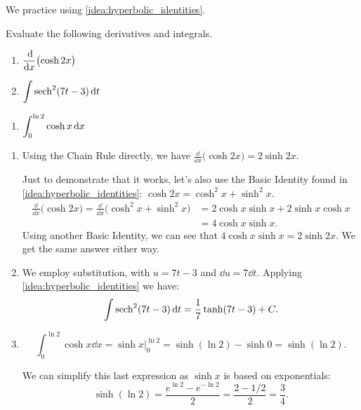 We practice using \autoref{idea:hyperbolic_identities}.

\begin{example}\label{ex_hf2}%
Evaluate the following derivatives and integrals.\\
\begin{minipage}[t]{.5\linewidth}
\begin{enumerate}
\item		$\displaystyle\frac{\operatorname{d}\!}{\operatorname{d}\! x}\bigl(\cosh 2x\bigr)$
\item		$\displaystyle\int \operatorname{sech}^2(7t-3)\operatorname{d}\! t$
\end{enumerate}
\end{minipage}%
\begin{minipage}[t]{.5\linewidth}
\begin{enumerate}\addtocounter{enumi}{2}
\item		$\displaystyle \int_0^{\ln 2} \cosh x\operatorname{d}\! x$
\end{enumerate}
\end{minipage}
\solution
\begin{enumerate}
\item		Using the Chain Rule directly, we have $\frac{\dd}{\dd x} \bigl(\cosh 2x\bigr) = 2\sinh 2x$.

Just to demonstrate that it works, let's also use the Basic Identity found in \autoref{idea:hyperbolic_identities}: $\cosh 2x = \cosh^2x+\sinh^2x$.
\begin{align*}
\frac{\dd}{\dd x}\bigl(\cosh 2x\bigr) = \frac{\dd}{\dd x}\bigl(\cosh^2x+\sinh^2x\bigr)
&= 2\cosh x\sinh x+ 2\sinh x\cosh x\\
&= 4\cosh x\sinh x.
\end{align*}
Using another Basic Identity, we can see that $4\cosh x\sinh x = 2\sinh 2x$. We get the same answer either way.

\item	  We employ substitution, with $u = 7t-3$ and $\dd u = 7\dd t$. Applying
\autoref{idea:hyperbolic_identities} we have:
\[\int \operatorname{sech}^2 (7t-3)\operatorname{d}\! t = \frac17\tanh (7t-3) + C.\]

\item \[\int_0^{\ln 2} \cosh x\dd x = \sinh x\Big|_0^{\ln 2} = \sinh (\ln 2) - \sinh 0 = \sinh(\ln 2).\]

We can simplify this last expression as $\sinh x$ is based on exponentials:
\[\sinh(\ln 2) = \frac{e^{\ln 2}-e^{-\ln 2}}2 = \frac{2-1/2}{2} = \frac34.\]
\end{enumerate}
\end{example}

